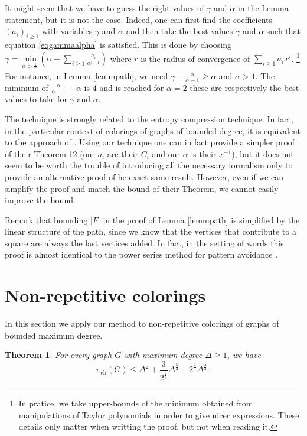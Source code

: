 \documentclass[a4paper,10pt]{article}
\newtheorem{theorem}{Theorem}
\begin{document}
It might seem that we have to guess the right values of $\gamma$ and $\alpha$ in the Lemma statement, but it is not the case. 
Indeed, one can first find the coefficients $(a_i)_{i\ge1}$ with variables $\gamma$ and $\alpha$ and then take the best values $\gamma$ and $\alpha$ such that equation \eqref{eqgammaalpha} is satisfied. This is done by choosing $\gamma= \min\limits_{\alpha>\frac{1}{r}}\left(\alpha+\sum\limits_{i\ge1}\frac{a_i}{\alpha^{i-1}}\right)$ where $r$ is the radius of convergence of $\sum_{i\ge1}a_i x^i$. \footnote{In pratice, we take upper-bounds  of the minimum obtained from manipulations of Taylor polynomials in order to give nicer expressions. These details only matter when writting the proof, but not when reading it.} 
For instance, in Lemma \ref{lemmpath}, we need $\gamma -\frac{\alpha}{\alpha-1}\ge \alpha$ and $\alpha>1$. The minimum of $\frac{\alpha}{\alpha-1}+\alpha$ is $4$ and is reached for $\alpha=2$ these are respectively the best values to take for $\gamma$ and $\alpha$.

The technique is strongly related to the entropy compression technique.
In fact, in the particular context of colorings of graphs of bounded degree, it is equivalent to the approach of 
\cite[Theorem 12]{MontassierEntropie}. 
Using our technique one can in fact provide a simpler proof of their Theorem 12 (our $a_i$ are their $C_i$ and our $\alpha$ is their $x^{-1}$), but it does not seem to be worth the trouble of  introducing all the necessary formalism only to provide an alternative proof of he exact same result. However, even if we can simplify the proof and match the bound of their Theorem, we cannot easily improve the bound.

Remark that bounding $|F|$ in the proof of Lemma \ref{lemmpath} is simplified by the linear structure of the path, since we know that the vertices that contribute to a square are always the last vertices added. 
In fact, in the setting of words this proof is almost identical to the power series method for pattern avoidance \cite{BELL20071295,BLANCHETSADRI201317,doublepat,rampersadpowerseries}.


\section{Non-repetitive colorings} 
In this section we apply our method to non-repetitive colorings of graphs of bounded maximum degree. 
\begin{theorem}\label{improvingthuenumber}
 For every graph $G$ with maximum degree $\Delta\ge1$, we have
 $$\pi_{\operatorname{ch}}(G)\le\Delta^2+\frac{3}{2^{\frac{2}{3}}}\Delta^{\frac{5}{3}}+2^{\frac{2}{3}}\Delta^{\frac{4}{3}}\,.$$
\end{theorem}
\end{document}
